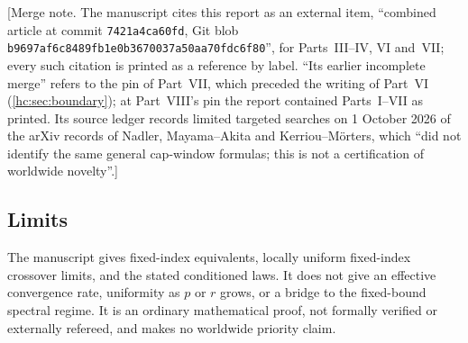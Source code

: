 \documentclass[11pt,a4paper]{article}
\theoremstyle{definition}\newaliascnt{definition}{theorem}
\theoremstyle{remark}\newaliascnt{remark}{theorem}
\begin{document}
[Merge note. The manuscript cites this report as an external item, ``combined
article at commit \texttt{7421a4ca60fd}, Git blob
\texttt{b9697af6c8489fb1e0b3670037a50aa70fdc6f80}'', for Parts~III--IV, VI
and~VII; every such citation is printed as a reference by label. ``Its earlier
incomplete merge'' refers to the pin of Part~VII, which preceded the writing of
Part~VI (\cref{hc:sec:boundary}); at Part~VIII's pin the report contained
Parts~I--VII as printed. Its source ledger records limited targeted searches
on 1 October 2026 of the arXiv records of Nadler, Mayama--Akita and
Kerriou--M\"orters, which ``did not identify the same general cap-window
formulas; this is not a certification of worldwide novelty''.]

\subsection{Limits}
\label{gc:sec:limits}
The manuscript gives fixed-index equivalents, locally uniform fixed-index
crossover limits, and the stated conditioned laws. It does not give an
effective convergence rate, uniformity as $p$ or $r$ grows, or a bridge to the
fixed-bound spectral regime. It is an ordinary mathematical proof, not formally
verified or externally refereed, and makes no worldwide priority claim.
\end{document}
